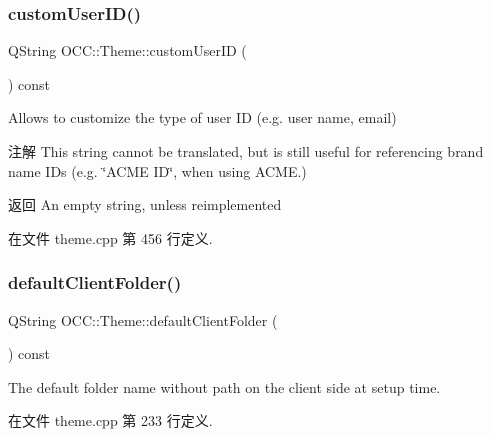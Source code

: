 \subsubsection{\texorpdfstring{custom\+User\+I\+D()}{customUserID()}}
{\footnotesize\ttfamily Q\+String O\+C\+C\+::\+Theme\+::custom\+User\+ID (\begin{DoxyParamCaption}{ }\end{DoxyParamCaption}) const\hspace{0.3cm}{\ttfamily [virtual]}}



Allows to customize the type of user ID (e.\+g. user name, email) 

\begin{DoxyNote}{注解}
This string cannot be translated, but is still useful for referencing brand name I\+Ds (e.\+g. \char`\"{}\+A\+C\+M\+E I\+D\char`\"{}, when using A\+C\+ME.)
\end{DoxyNote}
\begin{DoxyReturn}{返回}
An empty string, unless reimplemented 
\end{DoxyReturn}


在文件 theme.\+cpp 第 456 行定义.

\mbox{\label{class_o_c_c_1_1_theme_a8a45db118cc3ae16796857490d907f53}} 
\subsubsection{\texorpdfstring{default\+Client\+Folder()}{defaultClientFolder()}}
{\footnotesize\ttfamily Q\+String O\+C\+C\+::\+Theme\+::default\+Client\+Folder (\begin{DoxyParamCaption}{ }\end{DoxyParamCaption}) const\hspace{0.3cm}{\ttfamily [virtual]}}

The default folder name without path on the client side at setup time. 

在文件 theme.\+cpp 第 233 行定义.

\mbox{\label{class_o_c_c_1_1_theme_a4db1b04919bcdf3d209b7666aebd7b2c}} 

